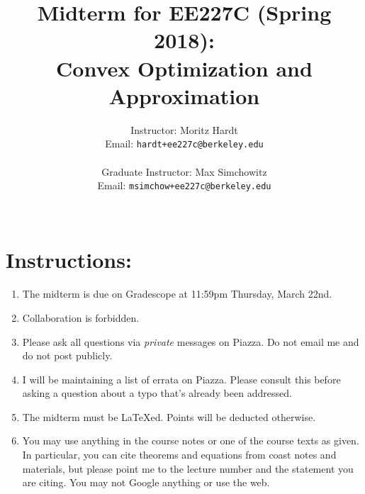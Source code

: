 \documentclass[12pt]{article}
\title{Midterm for EE227C (Spring 2018):\\
 Convex Optimization and Approximation }
\author{Instructor: Moritz Hardt\\
{\small Email: \tt hardt+ee227c@berkeley.edu}\\ ~\\
Graduate Instructor: Max Simchowitz\\
{\small Email: \tt msimchow+ee227c@berkeley.edu}\\ ~\\
}
\begin{document}




\maketitle

\section*{Instructions:}
\begin{enumerate}
	\item The midterm is due on Gradescope at 11:59pm Thursday, March 22nd.
	\item Collaboration is forbidden. 
	\item Please ask all questions via \emph{private} messages on Piazza. Do not email me and do not post publicly. 
	\item I will be maintaining a list of errata on Piazza. Please consult this before asking a question about a typo that's already been addressed.
	\item The midterm must be LaTeXed. Points will be deducted otherwise. 
	\item You may use anything in the course notes or one of the course texts as given. In particular, you can cite theorems and equations from coast notes and materials, but please point me to the lecture number and the statement you are citing. You may not Google anything or use the web.
\end{enumerate}
\end{document}
